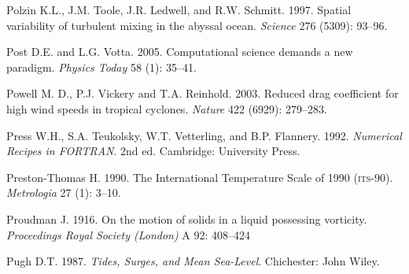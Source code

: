 \begin{thebibliography}{999}
Polzin K.L., J.M. Toole, J.R. Ledwell, and R.W. Schmitt. 1997. Spatial
variability of turbulent mixing in the abyssal ocean. \textit{Science}
276 (5309): 93--96.
%

Post D.E. and L.G. Votta.  2005. Computational science demands a new
paradigm. \textit{Physics Today} 58 (1): 35--41.
%

Powell M. D., P.J. Vickery and T.A. Reinhold.  2003. Reduced drag
coefficient for high wind speeds in tropical cyclones. \textit{Nature}
422 (6929): 279--283.
%

Press W.H., S.A. Teukolsky, W.T. Vetterling, and B.P. Flannery. 1992.
\textit{Numerical Recipes in FORTRAN}. 2nd ed.  Cambridge: University
Press.
%

Preston-Thomas H.  1990. The International Temperature Scale of 1990
(\textsc{its}-90). \textit{Metrologia} 27 (1): 3--10.
%

Proudman J.  1916. On the motion of solids in a liquid possessing
vorticity. \textit{Proceedings Royal Society (London)} A 92: 408--424
%

Pugh D.T.  1987. \textit{Tides, Surges, and Mean Sea-Level}.
Chichester: John Wiley.
%


\end{thebibliography}
